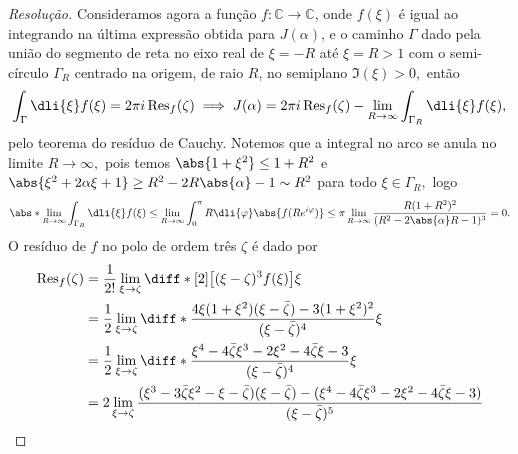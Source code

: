 \begin{proof}[Resolução]
    Consideramos agora a função \(f : \mathbb{C} \to \mathbb{C}\), onde \(f(\xi)\) é igual ao integrando na última expressão obtida para \(J(\alpha)\), e o caminho \(\Gamma\) dado pela união do segmento de reta no eixo real de \(\xi = -R\) até \(\xi = R > 1\) com o semi-círculo \(\Gamma_R\) centrado na origem, de raio \(R\), no semiplano \(\Im(\xi) > 0,\) então 
    \begin{equation*}
        \int_{\Gamma}\dli{\xi} f(\xi) = 2 \pi i \operatorname{Res}_f(\zeta) \implies J(\alpha) = 2\pi i \operatorname{Res}_{f}(\zeta) - \lim_{R \to \infty}\int_{\Gamma_R}\dli{\xi} f(\xi),
    \end{equation*}
    pelo teorema do resíduo de Cauchy. Notemos que a integral no arco se anula no limite \(R \to \infty,\) pois temos \(\abs{1 + \xi^2}\leq 1 + R^2\) e \(\abs{\xi^2 + 2 \alpha \xi + 1} \geq R^2 - 2R\abs{\alpha} - 1 \sim R^2\) para todo \(\xi \in \Gamma_R,\) logo 
    \begin{equation*}
        \abs*{\lim_{R \to\infty}{\int_{\Gamma_R}\dli{\xi} f(\xi)}} \leq \lim_{R \to \infty}{\int_{0}^{\pi} R\dli{\varphi} \abs{f(R e^{i\varphi})}} \leq \pi \lim_{R \to \infty}{\frac{R(1 + R^2)^2}{(R^2 - 2 \abs{\alpha}R - 1)^3}} = 0.
    \end{equation*}
    O resíduo de \(f\) no polo de ordem três \(\zeta\) é dado por
    \begin{align*}
        \operatorname{Res}_f(\zeta) &= \frac1{2!}\lim_{\xi \to \zeta}{\diff*[2]{\left[(\xi - \zeta)^3 f(\xi)\right]}{\xi} }\\
                                    &= \frac12 \lim_{\xi \to \zeta}{\diff*{\frac{4\xi(1 + \xi^2) (\xi - \bar{\zeta}) - 3(1 + \xi^2)^2}{(\xi - \bar{\zeta})^4}}{\xi}}\\
                                      &= \frac12 \lim_{\xi \to \zeta}{\diff*{\frac{\xi^4 - 4 \bar{\zeta} \xi^3 - 2\xi^2 - 4 \bar{\zeta} \xi - 3}{(\xi - \bar{\zeta})^4}}{\xi}}\\
                                      &= 2\lim_{\xi\to\zeta}{\frac{(\xi^3 - 3 \bar{\zeta} \xi^2 - \xi -  \bar{\zeta})(\xi - \bar{\zeta}) - (\xi^4 - 4 \bar{\zeta} \xi^3 - 2\xi^2 - 4 \bar{\zeta} \xi - 3)}{(\xi - \bar{\zeta})^5}}\\

\end{align*}
\end{proof}
